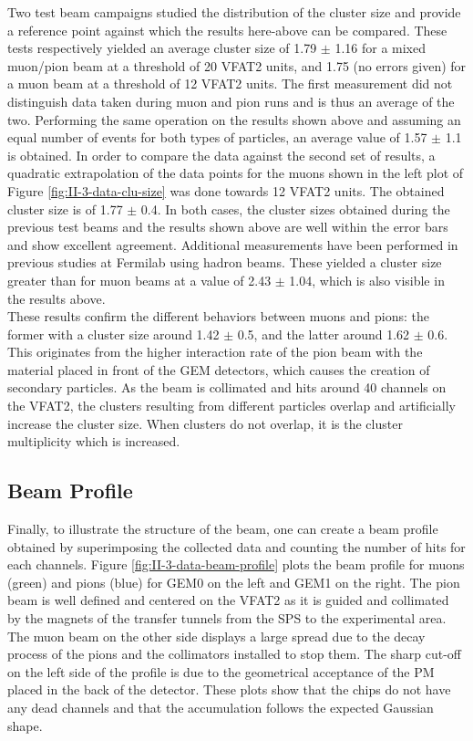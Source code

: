       Two test beam campaigns \cite{Abbaneo:1401079, Abbaneo:1494965} studied the distribution of the cluster size and provide a reference point against which the results here-above can be compared. These tests respectively yielded an average cluster size of 1.79 $\pm$ 1.16 for a mixed muon/pion beam at a threshold of 20 VFAT2 units, and 1.75 (no errors given) for a muon beam at a threshold of 12 VFAT2 units. The first measurement did not distinguish data taken during muon and pion runs and is thus an average of the two. Performing the same operation on the results shown above and assuming an equal number of events for both types of particles, an average value of 1.57 $\pm$ 1.1 is obtained. In order to compare the data against the second set of results, a quadratic extrapolation of the data points for the muons shown in the left plot of Figure \ref{fig:II-3-data-clu-size} was done towards 12 VFAT2 units. The obtained cluster size is of 1.77 $\pm$ 0.4. In both cases, the cluster sizes obtained during the previous test beams and the results shown above are well within the error bars and show excellent agreement. Additional measurements have been performed in previous studies \cite{Abbaneo:1973272} at Fermilab using hadron beams. These yielded a cluster size greater than for muon beams at a value of 2.43 $\pm$ 1.04, which is also visible in the results above. \\

      These results confirm the different behaviors between muons and pions: the former with a cluster size around 1.42 $\pm$ 0.5, and the latter around 1.62 $\pm$ 0.6. This originates from the higher interaction rate of the pion beam with the material placed in front of the GEM detectors, which causes the creation of secondary particles. As the beam is collimated and hits around 40 channels on the VFAT2, the clusters resulting from different particles overlap and artificially increase the cluster size. When clusters do not overlap, it is the cluster multiplicity which is increased.

    \subsection{Beam Profile}

      Finally, to illustrate the structure of the beam, one can create a beam profile obtained by superimposing the collected data and counting the number of hits for each channels. Figure \ref{fig:II-3-data-beam-profile} plots the beam profile for muons (green) and pions (blue) for GEM0 on the left and GEM1 on the right. The pion beam is well defined and centered on the VFAT2 as it is guided and collimated by the magnets of the transfer tunnels from the SPS to the experimental area. The muon beam on the other side displays a large spread due to the decay process of the pions and the collimators installed to stop them. The sharp cut-off on the left side of the profile is due to the geometrical acceptance of the PM placed in the back of the detector. These plots show that the chips do not have any dead channels and that the accumulation follows the expected Gaussian shape.

